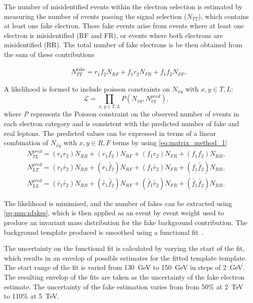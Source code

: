 The number of misidentified events within the electron selection is estimated by measuring the number of events passing the signal selection ($N_{TT}$), which contains at least one fake electron. These fake events arise from events where at least one electron is misidentified (RF and FR), or events where both electrons are misidentified (RR). The total number of fake electrons is be then obtained from the sum of these contributions

\begin{equation}
    \begin{aligned}\label{eq:mm:nfakes}
    & N^{\text{fake}}_{TT}=r_1f_2N_{RF}+f_1r_2N_{FR}+f_1f_2N_{FF} ,
    \end{aligned}
\end{equation}

A likelihood is formed to include poisson constraints on $N_{xy}$ with $x,y \in T,L$:
\begin{equation}
    \mathcal{L} = \prod_{x,y \in T,L} P(N_{xy},N_{xy}^{pred}), 
\end{equation}
where \emph{P} represents the Poisson constraint on the observed number of events in each electron category and is consistent with the predicted number of fake and real leptons. The predicted values can be expressed in terms of a linear combination of $N_{xy}$ with $x,y \in R,F$ terms by using \cref{eq:matrix_method_1}
\begin{equation}
    \begin{aligned}
    N_{TL}^{pred} = (r_1r_2)N_{RR} + (r_1f_2)N_{RF} + (f_1r_2)N_{FR} + (f_1f_2)N_{RR},  \\
    N_{LT}^{pred} = (r_1\tilde{r_2})N_{RR} + (r_1\tilde{f_2})N_{RF} + (f_1\tilde{r_2})N_{FR} + (f_1\tilde{f_2})N_{RR}, \\
    N_{LL}^{pred} = (\tilde{r_1}\tilde{r_2})N_{RR} + (\tilde{r_1}\tilde{f_2})N_{RF} + (\tilde{f_1}\tilde{r_2})N_{FR} + (\tilde{f_1}\tilde{f_2})N_{RR}.
    \end{aligned}
\end{equation}

The likelihood is minimised, and the number of fakes can be extracted using \cref{eq:mm:nfakes}, which is then applied as an event by event weight used to produce an invariant mass distribution for the fake background contribution. The background template produced is smoothed using a functional fit~\cite{EXOT-2016-05}. 

The uncertainty on the functional fit is calculated by varying the start of the fit, which results in an envelop of possible estimates for the fitted template template. The start range of the fit is varied from \SI{130}{\giga\electronvolt} to \SI{150}{\giga\electronvolt} in steps of \SI{2}{\giga\electronvolt}. The resulting envelop of the fits are taken as the uncertainty of the fake electron estimate. The uncertainty of the fake estimation varies from from 50\% at \SI{2}{\tera\electronvolt} to 110\% at \SI{5}{\tera\electronvolt}. 

